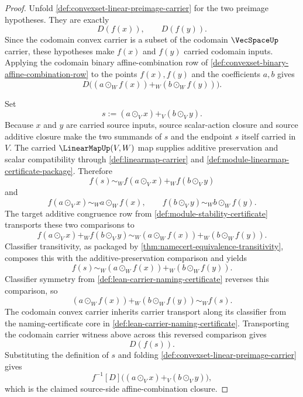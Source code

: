 \begin{proof}
Unfold \autoref{def:convexset-linear-preimage-carrier} for the two preimage hypotheses. They are exactly
$$
D(f(x)),
\qquad
D(f(y)).
$$
Since the codomain convex carrier is a subset of the codomain $\VecSpaceUp$ carrier, these hypotheses make $f(x)$ and $f(y)$ carried codomain inputs. Applying the codomain binary affine-combination row of \autoref{def:convexset-binary-affine-combination-row} to the points $f(x),f(y)$ and the coefficients $a,b$ gives
$$
D\bigl((a\odot_W f(x))+_W(b\odot_W f(y))\bigr).
$$

Set
$$
s:=(a\odot_V x)+_V(b\odot_V y).
$$
Because $x$ and $y$ are carried source inputs, source scalar-action closure and source additive closure make the two summands of $s$ and the endpoint $s$ itself carried in $V$. The carried $\LinearMapUp(V,W)$ map supplies additive preservation and scalar compatibility through \autoref{def:linearmap-carrier} and \autoref{def:module-linearmap-certificate-package}. Therefore
$$
f(s)\sim_W f(a\odot_V x)+_W f(b\odot_V y)
$$
and
$$
f(a\odot_V x)\sim_W a\odot_W f(x),
\qquad
f(b\odot_V y)\sim_W b\odot_W f(y).
$$
The target additive congruence row from \autoref{def:module-stability-certificate} transports these two comparisons to
$$
f(a\odot_V x)+_W f(b\odot_V y)
\sim_W
(a\odot_W f(x))+_W(b\odot_W f(y)).
$$
Classifier transitivity, as packaged by \autoref{thm:namecert-equivalence-transitivity}, composes this with the additive-preservation comparison and yields
$$
f(s)\sim_W(a\odot_W f(x))+_W(b\odot_W f(y)).
$$
Classifier symmetry from \autoref{def:lean-carrier-naming-certificate} reverses this comparison, so
$$
(a\odot_W f(x))+_W(b\odot_W f(y))\sim_W f(s).
$$
The codomain convex carrier inherits carrier transport along its classifier from the naming-certificate core in \autoref{def:lean-carrier-naming-certificate}. Transporting the codomain carrier witness above across this reversed comparison gives
$$
D(f(s)).
$$
Substituting the definition of $s$ and folding \autoref{def:convexset-linear-preimage-carrier} gives
$$
f^{-1}[D]\bigl((a\odot_V x)+_V(b\odot_V y)\bigr),
$$
which is the claimed source-side affine-combination closure.
\end{proof}

